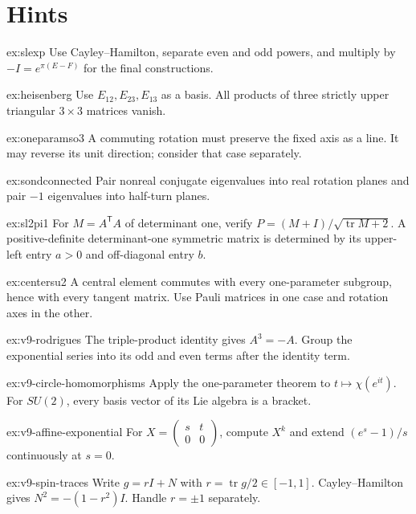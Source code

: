 \section{Hints}

\begin{hint}{ex:slexp}
Use Cayley--Hamilton, separate even and odd powers, and multiply by
$-I=e^{\pi(E-F)}$ for the final constructions.
\end{hint}
\begin{hint}{ex:heisenberg}
Use $E_{12},E_{23},E_{13}$ as a basis. All products of three strictly
upper triangular $3\times3$ matrices vanish.
\end{hint}
\begin{hint}{ex:oneparamso3}
A commuting rotation must preserve the fixed axis as a line. It may
reverse its unit direction; consider that case separately.
\end{hint}
\begin{hint}{ex:sondconnected}
Pair nonreal conjugate eigenvalues into real rotation planes and pair
$-1$ eigenvalues into half-turn planes.
\end{hint}
\begin{hint}{ex:sl2pi1}
For $M=A^{\mathsf T}A$ of determinant one, verify
$P=(M+I)/\sqrt{\operatorname{tr}M+2}$.
A positive-definite determinant-one symmetric matrix is determined by its
upper-left entry $a>0$ and off-diagonal entry $b$.
\end{hint}
\begin{hint}{ex:centersu2}
A central element commutes with every one-parameter subgroup, hence with
every tangent matrix. Use Pauli matrices in one case and rotation axes
in the other.
\end{hint}
\begin{hint}{ex:v9-rodrigues}
The triple-product identity gives $A^3=-A$. Group the exponential series
into its odd and even terms after the identity term.
\end{hint}
\begin{hint}{ex:v9-circle-homomorphisms}
Apply the one-parameter theorem to $t\mapsto\chi(e^{it})$.
For $SU(2)$, every basis vector of its Lie algebra is a bracket.
\end{hint}
\begin{hint}{ex:v9-affine-exponential}
For $X=\left(\begin{smallmatrix}s&t\\0&0\end{smallmatrix}\right)$,
compute $X^k$ and extend $(e^s-1)/s$ continuously at $s=0$.
\end{hint}
\begin{hint}{ex:v9-spin-traces}
Write $g=rI+N$ with $r=\operatorname{tr}g/2\in[-1,1]$.
Cayley--Hamilton gives $N^2=-(1-r^2)I$. Handle $r=\pm1$ separately.
\end{hint}


